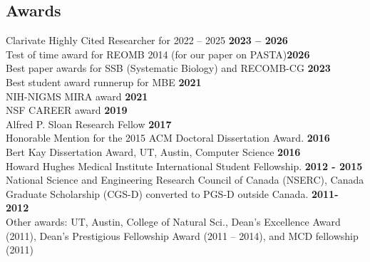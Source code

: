 \documentclass[margin,line,letterpaper]{resume}
\begin{document}
\begin{resume}
    \section{\mysidestyle Awards}
    Clarivate Highly Cited Researcher for 2022 -- 2025 \hfill \textbf{2023 -- 2026}\vspace{1mm}\\
    Test of time award for REOMB 2014 (for our paper on PASTA)\hfill \textbf{2026}\vspace{1mm}\\
    Best paper awards for SSB (Systematic Biology) and RECOMB-CG \hfill \textbf{2023}\vspace{1mm}\\
    Best student award runnerup for MBE \hfill \textbf{2021}\vspace{1mm}\\
    NIH-NIGMS MIRA award \hfill \textbf{ 2021}\vspace{1mm}\\
    NSF CAREER award \hfill \textbf{ 2019}\vspace{1mm}\\
    Alfred P. Sloan Research Fellow\hfill \textbf{ 2017}\vspace{1mm}\\
    Honorable Mention for the 2015 ACM Doctoral Dissertation Award.\hfill \textbf{ 2016}\vspace{1mm}\\
     Bert Kay Dissertation Award, UT,  Austin, Computer Science\hfill \textbf{ 2016}\vspace{1mm}\\
     Howard Hughes Medical Institute International Student Fellowship. \hfill \textbf{2012 - 2015}\vspace{1mm}\\
     National Science and Engineering Research Council of Canada (NSERC), 
      Canada Graduate Scholarship (CGS-D) converted to PGS-D outside Canada. \hfill \textbf{2011- 2012} \\
     Other awards: UT,  Austin, College of Natural Sci., Dean's Excellence Award (2011), Dean's Prestigious Fellowship Award (2011 --  2014), and MCD fellowship (2011) %
    

\end{resume}
\end{document}
